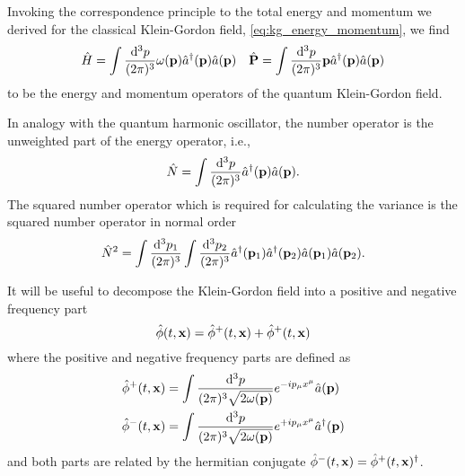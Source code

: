 \begin{lemma}
	Invoking the correspondence principle to the total energy and momentum we derived for the classical Klein-Gordon field, \cref{eq:kg_energy_momentum}, we find
	\begin{align}
		\hat{H}
		=
		\int\frac{\dd[3]{p}}{(2\pi)^3}
		\omega(\vb{p})\hat{a}^\dagger(\vb{p})\hat{a}(\vb{p})
		&&
		\hat{\vb{P}}
		=
		\int\frac{\dd[3]{p}}{(2\pi)^3}
		\vb{p}\hat{a}^\dagger(\vb{p})\hat{a}(\vb{p})
		\label{eq:qkg_energy_momentum}
	\end{align}
	to be the energy and momentum operators of the quantum Klein-Gordon field.
\end{lemma}
\begin{corollary}
	In analogy with the quantum harmonic oscillator, the number operator is the unweighted part of the energy operator, i.e.,
	\begin{equation}
		\hat{N}
		=
		\int\frac{\dd[3]{p}}{(2\pi)^3}
		\hat{a}^\dagger(\vb{p})
		\hat{a}(\vb{p})
		\label{eq:qkg_number}
		.
	\end{equation}
	The squared number operator which is required for calculating the variance is the squared number operator in normal order~\cite{Barnett2002}
	\begin{equation}
		\hat{N}^2
		=
		\int\frac{\dd[3]{p_1}}{(2\pi)^3}
		\int\frac{\dd[3]{p_2}}{(2\pi)^3}
		\hat{a}^\dagger(\vb{p}_1)
		\hat{a}^\dagger(\vb{p}_2)
		\hat{a}(\vb{p}_1)
		\hat{a}(\vb{p}_2)
		.
	\end{equation}
\end{corollary}

\begin{definition}
	It will be useful to decompose the Klein-Gordon field into a positive and negative frequency part
	\begin{equation}
		\hat\phi(t,\vb{x})
		=
		\hat\phi^+(t,\vb{x})
		+
		\hat\phi^+(t,\vb{x})
	\end{equation}
	where the positive and negative frequency parts are defined as~\cite[p.~26]{Peskin1995}
	\begin{align}
		\hat\phi^+(t,\vb{x})
		&=
		\int\frac{\dd[3]{p}}{(2\pi)^3\sqrt{2\omega(\vb{p})}}
		e^{-ip_\mu x^\mu}
		\hat{a}(\vb{p})
		\\
		\hat\phi^-(t,\vb{x})
		&=
		\int\frac{\dd[3]{p}}{(2\pi)^3\sqrt{2\omega(\vb{p})}}
		e^{+ip_\mu x^\mu}
		\hat{a}^\dagger(\vb{p})
	\end{align}
	and both parts are related by the hermitian conjugate $\hat\phi^-(t,\vb{x})=\hat\phi^+(t,\vb{x})^\dagger$.
\end{definition}
